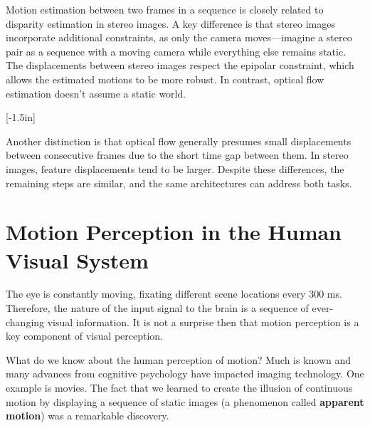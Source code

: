 Motion estimation between two frames in a sequence is closely related to disparity estimation in stereo images. A key difference is that stereo images incorporate additional constraints, as only the camera moves—imagine a stereo pair as a sequence with a moving camera while everything else remains static. The displacements between stereo images respect the epipolar constraint, which allows the estimated motions to be more robust. In contrast, optical flow estimation doesn't assume a static world.

[-1.5in]

Another distinction is that optical flow generally presumes small displacements between consecutive frames due to the short time gap between them. In stereo images, feature displacements tend to be larger. Despite these differences, the remaining steps are similar, and the same architectures can address both tasks.


\section{Motion Perception in the Human Visual System}


The eye is constantly moving, fixating different scene locations every 300 ms. Therefore, the nature of the input signal to the brain is a sequence of ever-changing visual information. It is not a surprise then that motion perception is a key component of visual perception.



What do we know about the human perception of motion?  Much is known and many advances from cognitive psychology have impacted imaging technology. One example is movies. The fact that we learned to create the illusion of continuous motion by displaying a sequence of static images (a phenomenon called {\bf apparent motion}) was a remarkable discovery. 

